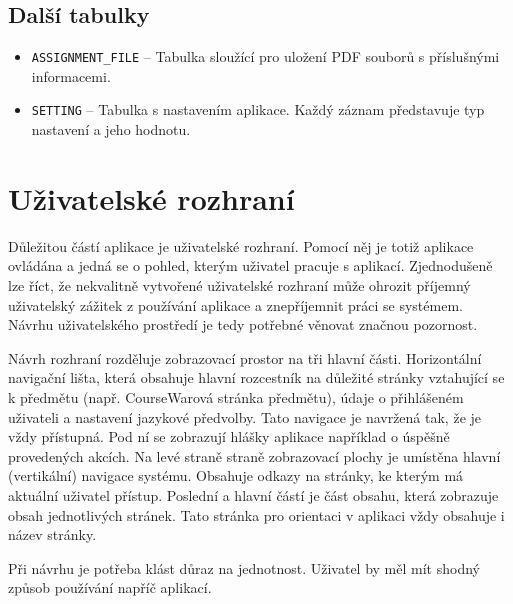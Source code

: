 \documentclass[czech,BP]{thesiskiv}
\begin{document}
		\subsection{Další tabulky}
			\begin{itemize}
				\item \texttt{ASSIGNMENT\_FILE} -- Tabulka sloužící pro uložení PDF souborů s příslušnými informacemi.
				\item \texttt{SETTING} -- Tabulka s nastavením aplikace. Každý záznam představuje typ nastavení a jeho hodnotu.
			\end{itemize}
	\section{Uživatelské rozhraní}
	\par Důležitou částí aplikace je uživatelské rozhraní. Pomocí něj je totiž aplikace ovládána a jedná se o pohled, kterým uživatel pracuje s aplikací. Zjednodušeně lze říct, že nekvalitně vytvořené uživatelské rozhraní může ohrozit příjemný uživatelský zážitek z používání aplikace a znepříjemnit práci se systémem. Návrhu uživatelského prostředí je tedy potřebné věnovat značnou pozornost.	
	\par Návrh rozhraní rozděluje zobrazovací prostor na tři hlavní části. Horizontální navigační lišta, která obsahuje hlavní rozcestník na důležité stránky vztahující se k předmětu (např. CourseWarová stránka předmětu), údaje o přihlášeném uživateli a nastavení jazykové předvolby. Tato navigace je navržená tak, že je vždy přístupná. Pod ní se zobrazují hlášky aplikace například o úspěšně provedených akcích. Na levé straně straně zobrazovací plochy je umístěna hlavní (vertikální) navigace systému. Obsahuje odkazy na stránky, ke kterým má aktuální uživatel přístup. Poslední a hlavní částí je část obsahu, která zobrazuje obsah jednotlivých stránek. Tato stránka pro orientaci v aplikaci vždy obsahuje i název stránky.
	\par Při návrhu je potřeba klást důraz na jednotnost. Uživatel by měl mít shodný způsob používání napříč aplikací.
	
\end{document}
